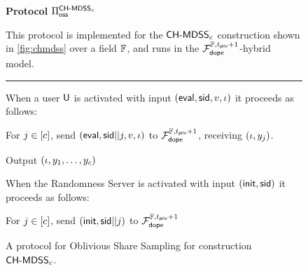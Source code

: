 \begin{figure}[h]
	\begin{center}
		\begin{techbox}
			\centerline{\textbf{Protocol} $\poss$}

			This protocol is implemented for the $\chmdss_\np$ construction shown in \cref{fig:chmdss} over a field $\field$, and runs in the $\fdope[\pd + 1]$-hybrid model.
			\vspace{1mm}
			\hrule
			\vspace{2mm}

			When a user $\user$ is activated with input $(\eval, \sid, \val, \shidx)$ it proceeds as follows:

			\begin{algenumerate}
				\item For $j \in [\np]$, send $(\eval, \sid||j, \val, \shidx)$ to $\fdope[\pd + 1]$, receiving $(\shidx, y_j)$.
				\item Output $(\shidx, y_1, \dots, y_c)$
			\end{algenumerate}

			\vspace{2mm}
			When the Randomness Server is activated with input $(\init, \sid)$ it proceeds as follows:
			\begin{algenumerate}
				\item For $j \in [\np]$, send $(\init, \sid||j)$ to $\fdope[\pd + 1]$
			\end{algenumerate}
		\end{techbox}
	\end{center}
	\caption[A protocol for Oblivious Share Sampling]{A protocol for Oblivious Share Sampling for construction $\chmdss_c$.}
	\label{fig:protocol_oss}
\end{figure}
